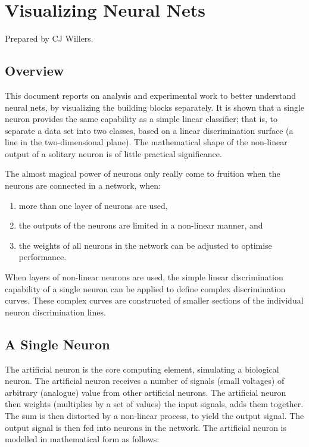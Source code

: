 
\chapter{Visualizing Neural Nets}
\label{sec:VisualizingNeuralNets}

Prepared by CJ Willers.


\section{Overview}
\label{sec:OverviewAppc}

This document reports on analysis and experimental work to better understand neural nets, by visualizing the building blocks separately.  It is shown that a single neuron provides the same capability as a simple linear classifier; that is, to separate a data set into two classes, based on a linear discrimination surface (a line in the two-dimensional plane).  The mathematical shape of  the non-linear output of a solitary neuron is of little practical significance.

The almost magical power of neurons only really come to fruition when the neurons are connected in a network, when: 
\begin{enumerate}
\item more than one layer of neurons are used, 
\item the outputs of the neurons are limited in a non-linear manner, and 
\item the weights of all neurons in the network can be adjusted to optimise performance.
\end{enumerate}

When layers of non-linear neurons are used, the simple linear discrimination capability of a single neuron can be applied to define complex discrimination curves.  These complex curves are constructed of smaller sections of the individual neuron discrimination lines.

\section{A Single Neuron}

The artificial neuron is the core computing element, simulating a biological neuron.  The artificial neuron receives a number of signals (small voltages) of arbitrary (analogue) value from other artificial neurons.  The artificial neuron then weights (multiplies by a set of values) the input signals, adds them together.  The sum is then distorted by a non-linear process, to yield the output signal. The output signal is then fed into neurons in the network.   The artificial neuron is modelled in mathematical form as follows:

